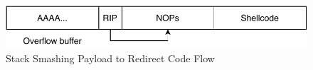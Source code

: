 \begin{figure}[htp!]
    \centering
    \includegraphics[width=\textwidth]{assets/figures/payload.pdf}
    \caption{Stack Smashing Payload to Redirect Code Flow}
    \label{fig:stack-smashing-payload}
\end{figure}
